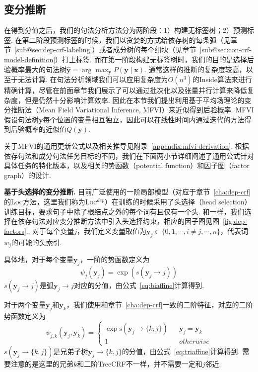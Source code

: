 \subsection{变分推断}

在得到分值之后，我们的句法分析方法分为两阶段：1）构建无标签树；2）预测标签.
在第二阶段预测标签的时候，我们以贪婪的方式给依存树的每条弧（见章节~\ref{sub@sec:dep-crf-labeling}）或者成分树的每个组块（见章节~\ref{sub@sec:con-crf-model-definition}）打上标签.
而在第一阶段构建无标签树时，我们的目的是选择后验概率最大的句法树$\hat{\boldsymbol{y}} = \arg\max_{\boldsymbol{y}} P(\boldsymbol{y}\mid \boldsymbol{x})$.
通常这样的推断的复杂度较高，以至于无法计算.
在句法分析领域我们可以应用复杂度为$O(n^3)$的Inside算法来进行精确计算，尽管在前面章节我们展示了可以通过批次化以及张量并行计算来降低复杂度，但是仍然十分影响计算效率.
因此在本节我们提出利用基于平均场理论的变分推断法（Mean Field Variational Inference, MFVI）来近似得到后验概率.
MFVI假设句法树$\boldsymbol{y}$每个位置的变量相互独立，因此可以在线性时间内通过迭代的方法得到后验概率的近似值$Q(\boldsymbol{y})$.

关于MFVI的通用更新公式以及相关推导见附录~\ref{appendix:mfvi-derivation}.
根据依存句法和成分句法任务目标的不同，我们在下面两小节详细阐述了通用公式针对具体任务的特化版本，以及相关的势函数（potential function）和因子图（factor graph）的设计.

\noindent\textbf{基于头选择的变分推断.}
目前广泛使用的一阶局部模型（对应于章节~\ref{cha:dep-crf}的\textsc{Loc}方法，这里我们称为\textsc{Loc}$^{dep}$）在训练的时候采用了头选择（head selection）训练目标，要求句子中除了根结点之外的每个词有且仅有一个头.
和\cite{wang-tu-2020-second}一样，我们选择在依存句法对应变分推断方法中引入头选择约束，相应的因子图见图~\ref{fig:dep-factors}..
对于每个变量$j$，我们定义变量取值为$\boldsymbol{y}_j\in \{0,1,\cdots,i\neq j,\cdots,n\}$，代表词$w_j$的可能的头索引.

具体地，对于每个变量$\boldsymbol{y}_j$，一阶的势函数定义为
\begin{equation}
    \label{eq:1o-potential}
    \psi_j(\boldsymbol{y}_j)=\exp(s(\boldsymbol{y}_j\rightarrow j))
\end{equation}
$s(\boldsymbol{y}_j\rightarrow j)$是弧$\boldsymbol{y}_j\rightarrow j$对应的分值，由公式~\ref{eq:biaffine}计算得到.

对于两个变量$\boldsymbol{y}_{j}$和$\boldsymbol{y}_{k}$，我们使用和章节~\ref{cha:dep-crf}一致的二阶特征，对应的二阶势函数定义为
\begin{equation}
    \label{eq:2o-dep-potential}
    \psi_{j,k}(\boldsymbol{y}_j,\boldsymbol{y}_k)=\left\{
    \begin{array}{rcl}
        \exp \mathrm{s}(\boldsymbol{y}_j\rightarrow \{k,j\}) &  & {\boldsymbol{y}_j=\boldsymbol{y}_k} \\
        1                                                    &  & {otherwise}
    \end{array}
    \right.
\end{equation}
$s(\boldsymbol{y}_j\rightarrow \{k,j\})$是兄弟子树$\boldsymbol{y}_j\rightarrow \{k,j\}$的分值，由公式~\ref{eq:triaffine}计算得到.
需要注意的是这里的兄弟$k$和二阶TreeCRF不一样，并不需要一定和$j$邻近.

